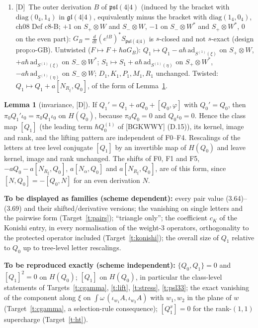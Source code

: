 \documentclass[11pt]{article}
\theoremstyle{definition}
\newtheorem{lemma}{Lemma}
\newcommand{\Dl}{\textup{[D]}}
\begin{document}
\begin{enumerate}
\item[F5.] \Dl\ The outer derivation $B$ of $\mathfrak{psl}(4|4)$ (induced by the bracket with $\mathrm{diag}(0_4,1_4)$ in $\mathfrak{gl}(4|4)$, equivalently minus the bracket with $\mathrm{diag}(1_4,0_4)$, ch08 Def c8-B; $+1$ on $S_+\otimes W$ and $S_-\otimes W$, $-1$ on $S_-\otimes W^*$ and $S_+\otimes W^*$, $0$ on the even part): $G_B=\frac d{dt}(e^{tB})^*S_{\mathfrak{psl}(4|4)}$ is $s$-closed and not $s$-exact (design prop:o-GB). Untwisted ($F\mapsto F+\hbar aG_B$): $Q_1\mapsto Q_1-a\hbar\,\mathrm{ad}_{S^{(1)}(\xi)}$ on $S_+\otimes W$, $+a\hbar\,\mathrm{ad}_{S^{(1)}(\xi)}$ on $S_-\otimes W^*$; $S_1\mapsto S_1+a\hbar\,\mathrm{ad}_{S^{(1)}(\eta)}$ on $S_+\otimes W^*$, $-a\hbar\,\mathrm{ad}_{S^{(1)}(\eta)}$ on $S_-\otimes W$; $D_1,K_1,P_1,M_1,R_1$ unchanged. Twisted: $Q_1\mapsto Q_1+a[N_{R_\xi},Q_0]$, of the form of Lemma~\ref{lem:inv}.
\end{enumerate}

\begin{lemma}[invariance, \Dl]\label{lem:inv}
If $Q_1'=Q_1+aQ_0+[Q_0,\varphi]$ with $Q_0'=Q_0$, then $\pi_0Q_1'\iota_0=\pi_0Q_1\iota_0$ on $H(Q_0)$, because $\pi_0Q_0=0$ and $Q_0\iota_0=0$. Hence the class map $[Q_1]$ (the leading term $\hbar Q^{(1)}_0$ of [BGKWWY] (D.15)), its kernel, image and rank, and the lifting pattern are independent of F0--F4. Rescalings of the letters at tree level conjugate $[Q_1]$ by an invertible map of $H(Q_0)$ and leave kernel, image and rank unchanged. The shifts of F0, F1 and F5, $-aQ_0-a[N_{R_\xi},Q_0]$, $a[N_\alpha,Q_0]$ and $a[N_{R_\xi},Q_0]$, are of this form, since $[N,Q_0]=-[Q_0,N]$ for an even derivation $N$.
\end{lemma}

\textbf{To be displayed as families (scheme dependent):} every pair value (3.64)--(3.69) and their shifted/derivative versions; the vanishing on single letters and the pairwise form (Target~\ref{t:pairs}); ``triangle only''; the coefficient $c_K$ of the Konishi entry, in every normalisation of the weight-$3$ operators, orthogonality to the protected operator included (Target~\ref{t:konishi}); the overall size of $Q_1$ relative to $Q_0$ up to tree-level letter rescalings.

\textbf{To be reproduced exactly (scheme independent):} $\{Q_0,Q_1\}=0$ and $[Q_1]^2=0$ on $H(Q_0)$; $[Q_1]$ on $H(Q_0)$, in particular the class-level statements of Targets~\ref{t:cgamma}, \ref{t:lift}, \ref{t:stress}, \ref{t:psl33}; the exact vanishing of the component along $\xi$ on $\int\omega\,(\iota_{w_1}A,\iota_{w_2}A)$ with $w_1,w_2$ in the plane of $w$ (Target~\ref{t:cgamma}, a selection-rule consequence); $[Q_1^x]=0$ for the rank-$(1,1)$ supercharge (Target~\ref{t:ht}).
\end{document}
